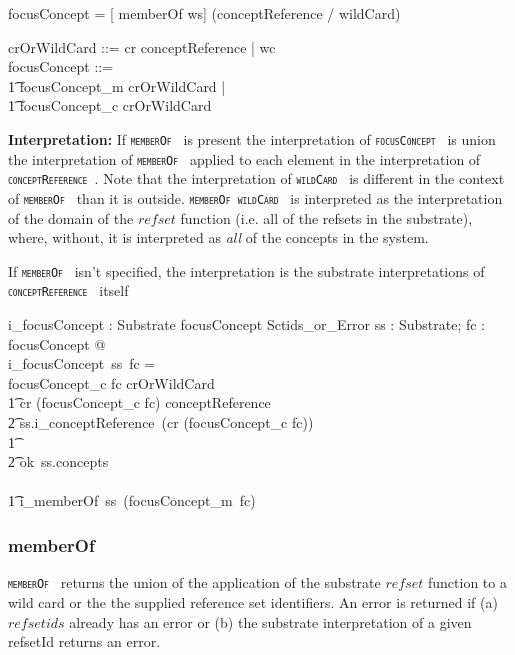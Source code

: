 \documentclass{article}
\def\spec#1{{\tt \small \textsc{{#1}} }}
\def\bnf#1{{\scriptsize {{#1}} }}
\begin{document}
\begin{framed}
\bnf{focusConcept = [ memberOf ws] (conceptReference / wildCard)} 
\end{framed}

\begin{zed}
crOrWildCard ::= cr \ldata conceptReference \rdata | wc  \\
focusConcept ::= \\
\t1 focusConcept\_m \ldata crOrWildCard \rdata | \\
\t1 focusConcept\_c \ldata crOrWildCard \rdata
\end{zed}


\textbf{Interpretation:}  If  \spec{memberOf} is present the interpretation of  \spec{focusConcept} is union the interpretation of \spec{memberOf} applied to
each element in the interpretation of \spec{conceptReference}.  Note that the interpretation of \spec{wildCard} is different in the context of \spec{memberOf} than
it is outside.  \spec{memberOf wildCard} is interpreted as the interpretation of the domain of the $refset$ function (i.e. all of the refsets in the substrate), where, without,
it is interpreted as \emph{all} of the concepts in the system.

  If \spec{memberOf} isn't specified, the interpretation is the substrate interpretations of \spec{conceptReference} itself

\begin{gendef}
   i\_focusConcept : Substrate \fun focusConcept \fun Sctids\_or\_Error 
\where
   \forall ss : Substrate; fc : focusConcept @ \\
i\_focusConcept~ss~fc = \\
\IF focusConcept\_c \inv fc \in crOrWildCard \THEN \\
\t1 \IF cr \inv (focusConcept\_c \inv fc) \in conceptReference \THEN \\
\t2 ss.i\_conceptReference~(cr \inv (focusConcept\_c \inv fc)) \\
\t1 \ELSE \\
\t2 ok~ss.concepts \\
 \ELSE \\
\t1  i\_memberOf~ss~(focusConcept\_m~\inv fc)
\end{gendef}

\subsubsection{memberOf}
\spec{memberOf} returns the union of the application of the substrate $refset$ function to a wild card or the  the supplied reference set identifiers.  An error is
returned if (a) $refsetids$ already has an error or (b) the substrate interpretation of a given refsetId returns an error.
\end{document}
